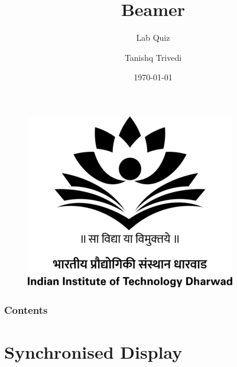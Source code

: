 \documentclass{beamer}
\title[Beamer]{Beamer}
\subtitle{Lab Quiz}
\author{Tanishq Trivedi}
\date{\today}
\institute{IIT Dharwad}
\begin{document}
\begin{frame}
\titlepage
\begin{figure}
\centering
\includegraphics[scale=0.25]{iitdhlogo}
\end{figure}
\end{frame}

\begin{frame}
\frametitle{Contents}
\tableofcontents
\end{frame}

\section{Synchronised Display}
\end{document}
